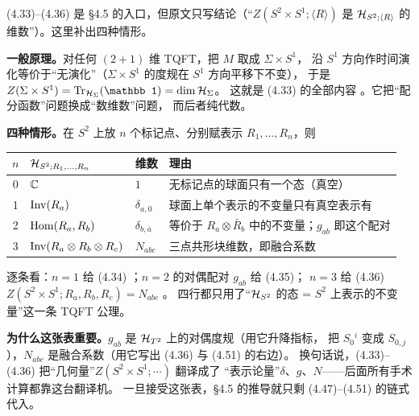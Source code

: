 \begin{derivation}
(4.33)--(4.36) 是 \S4.5 的入口，但原文只写结论（“$Z(S^2\times S^1;\langle R\rangle)$ 是
$\mathcal{H}_{S^2;\langle R\rangle}$ 的维数”）。这里补出四种情形。

\textbf{一般原理。}对任何 $(2+1)$ 维 TQFT，把 $M$ 取成 $\Sigma\times S^1$，
沿 $S^1$ 方向作时间演化等价于“无演化”（$\Sigma\times S^1$ 的度规在 $S^1$ 方向平移下不变），
于是 $Z(\Sigma\times S^1)=\Tr_{\cH_\Sigma}(\mathbb 1)=\dim\cH_\Sigma$。
这就是 (4.33) 的全部内容 。它把“配分函数”问题换成“数维数”问题，
而后者纯代数。

\textbf{四种情形。}在 $S^2$ 上放 $n$ 个标记点、分别赋表示 $R_1,\dots,R_n$，则
\begin{center}
\small
\begin{tabular}{@{}clll@{}}
\toprule
$n$ & $\mathcal{H}_{S^2;R_1,\dots,R_n}$ & 维数 & 理由 \\
\midrule
0 & $\mathbb{C}$ & $1$ & 无标记点的球面只有一个态（真空）\\
1 & $\operatorname{Inv}(R_a)$ & $\delta_{a,0}$ & 球面上单个表示的不变量只有真空表示有 \\
2 & $\operatorname{Hom}(R_a,R_b)$ & $\delta_{b,\bar a}$ & 等价于 $R_a\otimes\bar R_b$ 中的不变量；$g_{ab}$ 即这个配对\\
3 & $\operatorname{Inv}(R_a\otimes R_b\otimes R_c)$ & $N_{abc}$ & 三点共形块维数，即融合系数\\
\bottomrule
\end{tabular}
\end{center}
逐条看：$n=1$ 给 (4.34) ；$n=2$ 的对偶配对 $g_{ab}$ 给 (4.35)；
$n=3$ 给 (4.36) $Z(S^2\times S^1;R_a,R_b,R_c)=N_{abc}$ 。
四行都只用了“$\mathcal{H}_{S^2}$ 的态 = $S^2$ 上表示的不变量”这一条 TQFT 公理。

\textbf{为什么这张表重要。}$g_{ab}$ 是 $\mathcal{H}_{T^2}$ 上的对偶度规（用它升降指标，
把 $S_{0}{}^i$ 变成 $S_{0,j}$），$N_{abc}$ 是融合系数（用它写出 (4.36) 与 (4.51) 的右边）。
换句话说，(4.33)--(4.36) 把“几何量”$Z(S^2\times S^1;\cdots)$ 翻译成了
“表示论量”$\delta$、$g$、$N$——后面所有手术计算都靠这台翻译机。
一旦接受这张表，\S4.5 的推导就只剩 (4.47)--(4.51) 的链式代入。\ours
\end{derivation}

